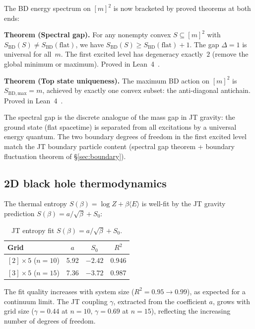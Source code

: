 \documentclass[aps,prd,twocolumn,superscriptaddress]{revtex4-2}
\begin{document}
The BD energy spectrum on $[m]^2$ is now bracketed by proved
theorems at both ends:

\textbf{Theorem (Spectral gap).}
For any nonempty convex $S \subseteq [m]^2$ with
$S_{\mathrm{BD}}(S) \neq S_{\mathrm{BD}}(\text{flat})$,
we have $S_{\mathrm{BD}}(S) \geq S_{\mathrm{BD}}(\text{flat}) + 1$.
The gap $\Delta = 1$ is universal for all~$m$.
The first excited level has degeneracy exactly~$2$
(remove the global minimum or maximum).
Proved in Lean~4~\cite{leanrepo}.

\textbf{Theorem (Top state uniqueness).}
The maximum BD action on $[m]^2$ is $S_{\mathrm{BD,max}} = m$,
achieved by exactly one convex subset: the anti-diagonal antichain.
Proved in Lean~4~\cite{leanrepo}.

\noindent
The spectral gap is the discrete analogue of the mass gap in
JT gravity: the ground state (flat spacetime) is separated from
all excitations by a universal energy quantum. The two boundary
degrees of freedom in the first excited level match the
JT boundary particle content (spectral gap theorem +
boundary fluctuation theorem of \S\ref{sec:boundary}).

\subsection{2D black hole thermodynamics}

The thermal entropy $S(\beta) = \log Z + \beta \langle E \rangle$
is well-fit by the JT gravity prediction $S(\beta) = a/\sqrt{\beta}
+ S_0$:

\begin{table}[h]
\caption{JT entropy fit $S(\beta) = a/\sqrt{\beta} + S_0$.}
\label{tab:entropy}
\begin{ruledtabular}
\begin{tabular}{lccc}
Grid & $a$ & $S_0$ & $R^2$ \\
\midrule
$[2] \times 5$ ($n=10$) & 5.92 & $-2.42$ & 0.946 \\
$[3] \times 5$ ($n=15$) & 7.36 & $-3.72$ & 0.987 \\
\end{tabular}
\end{ruledtabular}
\end{table}

The fit quality increases with system size ($R^2 = 0.95 \to 0.99$),
as expected for a continuum limit. The JT coupling $\gamma$,
extracted from the coefficient $a$, grows with grid size
($\gamma = 0.44$ at $n = 10$, $\gamma = 0.69$ at $n = 15$),
reflecting the increasing number of degrees of freedom.
\end{document}
